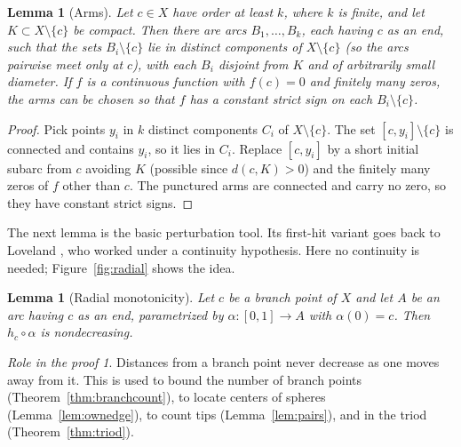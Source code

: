 \documentclass[11pt]{amsart}
\newtheorem{lemma}[theorem]{Lemma}
\theoremstyle{definition}
\theoremstyle{remark}
\newtheorem*{role}{Role in the proof}
\begin{document}
\begin{lemma}[Arms]\label{lem:arms}
Let $c\in X$ have order at least $k$, where $k$ is finite, and let $K\subset X\setminus\{c\}$ be compact. Then there are arcs $B_1,\dots,B_k$, each having $c$ as an end, such that the sets $B_i\setminus\{c\}$ lie in distinct components of $X\setminus\{c\}$ (so the arcs pairwise meet only at $c$), with each $B_i$ disjoint from $K$ and of arbitrarily small diameter. If $f$ is a continuous function with $f(c)=0$ and finitely many zeros, the arms can be chosen so that $f$ has a constant strict sign on each $B_i\setminus\{c\}$.
\end{lemma}
\begin{proof}
Pick points $y_i$ in $k$ distinct components $C_i$ of $X\setminus\{c\}$. The set $[c,y_i]\setminus\{c\}$ is connected and contains $y_i$, so it lies in $C_i$. Replace $[c,y_i]$ by a short initial subarc from $c$ avoiding $K$ (possible since $d(c,K)>0$) and the finitely many zeros of $f$ other than $c$. The punctured arms are connected and carry no zero, so they have constant strict signs.
\end{proof}

The next lemma is the basic perturbation tool. Its first-hit variant goes back to Loveland \cite[Lemma~2.5]{L76b}, who worked under a continuity hypothesis. Here no continuity is needed; Figure~\ref{fig:radial} shows the idea.

\begin{lemma}[Radial monotonicity]\label{lem:radial}
Let $c$ be a branch point of $X$ and let $A$ be an arc having $c$ as an end, parametrized by $\alpha:[0,1]\to A$ with $\alpha(0)=c$. Then $h_c\circ\alpha$ is nondecreasing.
\end{lemma}

\begin{role}
Distances from a branch point never decrease as one moves away from it. This is used to bound the number of branch points (Theorem~\ref{thm:branchcount}), to locate centers of spheres (Lemma~\ref{lem:ownedge}), to count tips (Lemma~\ref{lem:pairs}), and in the triod (Theorem~\ref{thm:triod}).
\end{role}
\end{document}
